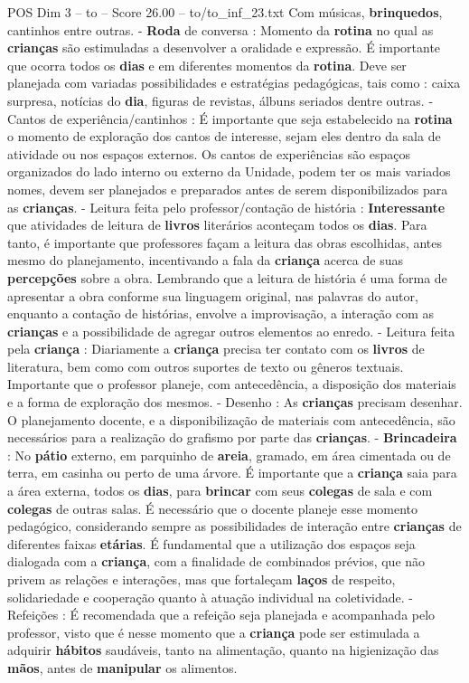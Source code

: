 \begin{textsample}{POS Dim 3 – to – Score 26.00 – to/to\_inf\_23.txt}
Com músicas, \textbf{brinquedos}, cantinhos entre outras. - \textbf{Roda} de conversa : Momento da \textbf{rotina} no qual as \textbf{crianças} são estimuladas a desenvolver a oralidade e expressão.
É importante que ocorra todos os \textbf{dias} e em diferentes momentos da \textbf{rotina}.
Deve ser planejada com variadas possibilidades e estratégias pedagógicas, tais como : caixa surpresa, notícias do \textbf{dia}, figuras de revistas, álbuns seriados dentre outras. - Cantos de experiência/cantinhos : É importante que seja estabelecido na \textbf{rotina} o momento de exploração dos cantos de interesse, sejam eles dentro da sala de atividade ou nos espaços externos.
Os cantos de experiências são espaços organizados do lado interno ou externo da Unidade, podem ter os mais variados nomes, devem ser planejados e preparados antes de serem disponibilizados para as \textbf{crianças}. - Leitura feita pelo professor/contação de história : \textbf{Interessante} que atividades de leitura de \textbf{livros} literários aconteçam todos os \textbf{dias}.
Para tanto, é importante que professores façam a leitura das obras escolhidas, antes mesmo do planejamento, incentivando a fala da \textbf{criança} acerca de suas \textbf{percepções} sobre a obra.
Lembrando que a leitura de história é uma forma de apresentar a obra conforme sua linguagem original, nas palavras do autor, enquanto a contação de histórias, envolve a improvisação, a interação com as \textbf{crianças} e a possibilidade de agregar outros elementos ao enredo. - Leitura feita pela \textbf{criança} : Diariamente a \textbf{criança} precisa ter contato com os \textbf{livros} de literatura, bem como com outros suportes de texto ou gêneros textuais.
Importante que o professor planeje, com antecedência, a disposição dos materiais e a forma de exploração dos mesmos. - Desenho : As \textbf{crianças} precisam desenhar.
O planejamento docente, e a disponibilização de materiais com antecedência, são necessários para a realização do grafismo por parte das \textbf{crianças}. - \textbf{Brincadeira} : No \textbf{pátio} externo, em parquinho de \textbf{areia}, gramado, em área cimentada ou de terra, em casinha ou perto de uma árvore.
É importante que a \textbf{criança} saia para a área externa, todos os \textbf{dias}, para \textbf{brincar} com seus \textbf{colegas} de sala e com \textbf{colegas} de outras salas.
É necessário que o docente planeje esse momento pedagógico, considerando sempre as possibilidades de interação entre \textbf{crianças} de diferentes faixas \textbf{etárias}.
É fundamental que a utilização dos espaços seja dialogada com a \textbf{criança}, com a finalidade de combinados prévios, que não privem as relações e interações, mas que fortaleçam \textbf{laços} de respeito, solidariedade e cooperação quanto à atuação individual na coletividade. - Refeições : É recomendada que a refeição seja planejada e acompanhada pelo professor, visto que é nesse momento que a \textbf{criança} pode ser estimulada a adquirir \textbf{hábitos} saudáveis, tanto na alimentação, quanto na higienização das \textbf{mãos}, antes de \textbf{manipular} os alimentos.

\end{textsample}
